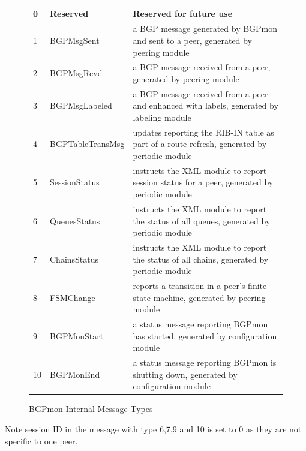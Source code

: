 \begin{figure}
\centering
\begin{tabular}{| l | l | l |}
\hline
0 & Reserved & Reserved for future use \\
\hline
1 & BGPMsgSent  &  a BGP message generated by BGPmon and sent to a peer, generated by peering module\\
\hline
2 & BGPMsgRcvd & a BGP message received from a peer, generated by peering module\\
\hline
3 & BGPMsgLabeled &  a BGP message received from a peer and enhanced with labels, generated by labeling module\\
\hline
4  & BGPTableTransMsg &  updates reporting the RIB-IN table as part of a route refresh, generated by periodic module\\
\hline
5 & SessionStatus& instructs the XML module to report session status for a peer, generated by periodic module\\
\hline
6 & QueuesStatus& instructs the XML module to report  the status of all queues, generated by periodic module\\
\hline
7 & ChainsStatus& instructs the XML module to report the status of all chains, generated by periodic module\\
\hline
8 & FSMChange &  reports a transition in a peer's finite state machine, generated by peering module\\
\hline
9 & BGPMonStart &  a status message reporting BGPmon has started, generated by configuration module\\
\hline
10 & BGPMonEnd &  a status message reporting BGPmon is shutting down, generated by configuration module\\
\hline
\end{tabular}
\caption{BGPmon Internal Message Types}
\label{tab:types}
\end{figure}
Note session ID in the message with type 6,7,9 and 10 is set to 0 as they are not specific to one peer.
 

